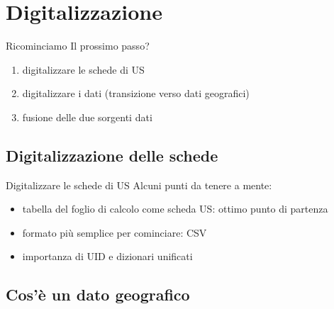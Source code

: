\documentclass{beamer}
\begin{document}
    \section{Digitalizzazione}

        \begin{frame}{Ricominciamo}
            Il prossimo passo?
            \begin{enumerate}
                \item digitalizzare le schede di US
                \item digitalizzare i dati (transizione verso dati geografici)
                \item fusione delle due sorgenti dati
            \end{enumerate}
        \end{frame}

        \subsection{Digitalizzazione delle schede}

            \begin{frame}{Digitalizzare le schede di US}
                Alcuni punti da tenere a mente:
                \begin{itemize}
                    \item tabella del foglio di calcolo come scheda US: ottimo punto di partenza
                    \item formato più semplice per cominciare: CSV
                    \item importanza di UID e dizionari unificati
                \end{itemize}
                \begin{center}
                \end{center}
            \end{frame}

        \subsection{Cos'è un dato geografico}
\end{document}
